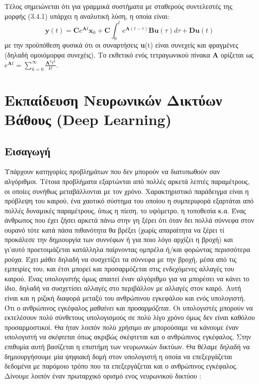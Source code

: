 \documentclass[11pt]{article} %
\numberwithin{equation}{subsection}
\begin{document}
Τέλος σημειώνεται ότι για γραμμικά συστήματα με σταθερούς συντελεστές της μορφής (3.4.1) υπάρχει η αναλυτική λύση, η οποία είναι:
\begin{equation}
\textbf{y}(t) = \textbf{C}e^{\textbf{A}t}\textbf{x}_{0}+ \textbf{C} \int_{0}^{t} e^{\textbf{A}(t-\tau)}\textbf{B}\textbf{u}(\tau)d\tau + \textbf{D}\textbf{u}(t)
\end{equation}
με την προϋπόθεση φυσικά ότι οι συναρτήσεις \textbf{u}(t) είναι συνεχείς και φραγμένες (δηλαδή ομοιόμορφα συνεχέις). Το εκθετικό ενός τετραγωνικού πίνακα \textbf{Α} ορίζεται ως $e^{\textbf{A}t} = \displaystyle \sum_{k=0}^{\infty} \frac{\textbf{A}^{k} t ^{k}}{k!}$.

\newpage

\section{Εκπαίδευση Νευρωνικών Δικτύων Βάθους (Deep Learning)}

\subsection{Εισαγωγή}

Υπάρχουν κατηγορίες προβλημάτων που δεν μπορούν να διατυπωθούν σαν αλγόριθμοι. Τέτοια προβλήματα εξαρτώνται από πολλές αρκετά λεπτές παραμέτρους, οι οποίες συνήθως μεταβάλλονται με τον χρόνο. Χαρακτηριστικό παράδειγμα είναι η πρόβλεψη του καιρού, ένα χαοτικό σύστημα του οποίου η συμπεριφορά εξαρτάται από πολλές δυναμικές παραμέτρους, όπως η πίεση, το υψόμετρο, η τοποθεσία κ.α. Ένας άνθρωπος που έχει ζήσει αρκετά πάνω στην γη ξέρει ότι όταν δει πολλά σύννεφα στον ουρανό τότε κατά πάσα πιθανότητα θα βρέξει (χωρίς απαραίτητα να ξέρει τί προκάλεσε την δημιουργία των συννέφων ή για ποιο λόγο αρχίζει η βροχή) και γι'αυτό προετοιμάζεται κατάλληλα παίρνοντας ομπρέλα ή/και φορώντας περισσότερα ρούχα. Έχει \textit{μάθει} δηλαδή να συσχετίζει τα σύννεφα με την βροχή, μέσα από τις εμπειρίες του, και έτσι μπορεί και προσαρμόζεται στις ενδεχόμενες αλλαγές του καιρού. Ένας υπολογιστής όμως απαιτεί έναν αλγόριθμο για να μπορέσει να κάνει το ίδιο, δηλαδή να συσχετίσει αλλαγές στο περιβάλλον με αλλαγές στον καιρό. Αυτή είναι και η ριζική διαφορά μεταξύ του ανθρώπινου εγκεφάλου και ενός υπολογιστή. Ότι ο ανθρώπινος εγκέφαλος \textit{μαθαίνει} και \textit{προσαρμόζεται}. Οι υπολογιστές μπορούν να εκτελέσουν πολύ σύνθετους υπολογισμούς σε πολύ λίγο χρόνο όμως δεν είναι καθόλου προσαρμοστικοί. Θα ήταν λοιπόν πολύ χρήσιμο αν μπορούσαμε να κάνουμε έναν υπολογιστή να \textit{σκέφτεται} όπως ακριβώς σκέφτεται και ο ανθρώπινος εγκέφαλος. Στην επιθυμία αυτή βασίζεται η επιστήμη των νευρωνικών δικτύων. Θα θέλαμε δηλαδή να δημιουργήσουμε μία ψηφιακή δομή στον υπολογιστή η οποία να επεξεργάζεται δεδομένα με παρόμοιο τρόπο που τα επεξεργάζεται και ο ανθρώπινος εγκέφαλος. Δίνουμε λοιπόν έναν πρωταρχικό ορισμό ενος νευρωνικού δικτύου \cite{neuralnets}:\\
\end{document}
